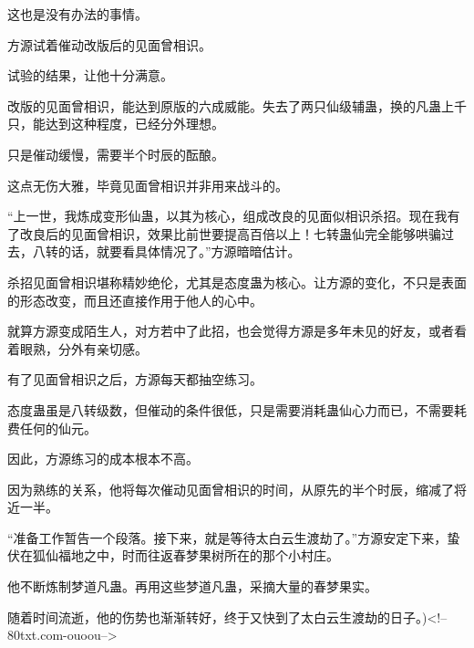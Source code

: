 \begin{this_body}
这也是没有办法的事情。

方源试着催动改版后的见面曾相识。

试验的结果，让他十分满意。

改版的见面曾相识，能达到原版的六成威能。失去了两只仙级辅蛊，换的凡蛊上千只，能达到这种程度，已经分外理想。

只是催动缓慢，需要半个时辰的酝酿。

这点无伤大雅，毕竟见面曾相识并非用来战斗的。

“上一世，我炼成变形仙蛊，以其为核心，组成改良的见面似相识杀招。现在我有了改良后的见面曾相识，效果比前世要提高百倍以上！七转蛊仙完全能够哄骗过去，八转的话，就要看具体情况了。”方源暗暗估计。

杀招见面曾相识堪称精妙绝伦，尤其是态度蛊为核心。让方源的变化，不只是表面的形态改变，而且还直接作用于他人的心中。

就算方源变成陌生人，对方若中了此招，也会觉得方源是多年未见的好友，或者看着眼熟，分外有亲切感。

有了见面曾相识之后，方源每天都抽空练习。

态度蛊虽是八转级数，但催动的条件很低，只是需要消耗蛊仙心力而已，不需要耗费任何的仙元。

因此，方源练习的成本根本不高。

因为熟练的关系，他将每次催动见面曾相识的时间，从原先的半个时辰，缩减了将近一半。

“准备工作暂告一个段落。接下来，就是等待太白云生渡劫了。”方源安定下来，蛰伏在狐仙福地之中，时而往返春梦果树所在的那个小村庄。

他不断炼制梦道凡蛊。再用这些梦道凡蛊，采摘大量的春梦果实。

随着时间流逝，他的伤势也渐渐转好，终于又快到了太白云生渡劫的日子。)<!--80txt.com-ouoou-->

\end{this_body}

